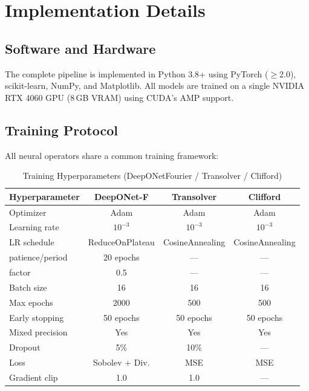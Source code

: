 \documentclass[journal]{IEEEtran}
\begin{document}
\section{Implementation Details}
\label{sec:impl}

\subsection{Software and Hardware}

The complete pipeline is implemented in Python 3.8+ using PyTorch ($\geq$2.0), scikit-learn, NumPy, and Matplotlib. All models are trained on a single NVIDIA RTX 4060 GPU (8\,GB VRAM) using CUDA's AMP support.

\subsection{Training Protocol}

All neural operators share a common training framework:

\begin{table}[htbp]
\caption{Training Hyperparameters (DeepONetFourier / Transolver / Clifford)}
\label{tab:training}
\centering
\begin{tabular}{lccc}
\toprule
\textbf{Hyperparameter} & \textbf{DeepONet-F} & \textbf{Transolver} & \textbf{Clifford} \\
\midrule
Optimizer & Adam & Adam & Adam \\
Learning rate & $10^{-3}$ & $10^{-3}$ & $10^{-3}$ \\
LR schedule & ReduceOnPlateau & CosineAnnealing & CosineAnnealing \\
  \quad patience/period & 20 epochs & --- & --- \\
  \quad factor & 0.5 & --- & --- \\
Batch size & 16 & 16 & 16 \\
Max epochs & 2000 & 500 & 500 \\
Early stopping & 50 epochs & 50 epochs & 50 epochs \\
Mixed precision & Yes & Yes & Yes \\
Dropout & 5\% & 10\% & --- \\
Loss & Sobolev + Div. & MSE & MSE \\
Gradient clip & 1.0 & 1.0 & --- \\
\bottomrule
\end{tabular}
\end{table}
\end{document}
